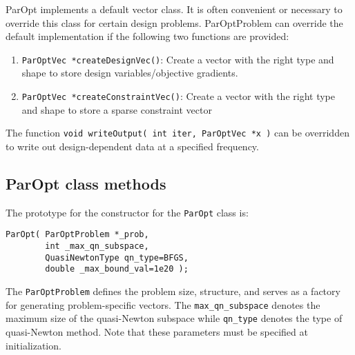 \documentclass[12pt]{article}
\begin{document}
ParOpt implements a default vector class. 
It is often convenient or necessary to override this class for certain design problems.
ParOptProblem can override the default implementation if the following two functions are provided:
\begin{enumerate}
\item \texttt{ParOptVec *createDesignVec()}: Create a vector with the right type and shape to store design variables/objective gradients.
\item \texttt{ParOptVec *createConstraintVec()}: Create a vector with the right type and shape to store a sparse constraint vector
\end{enumerate}  

The function \texttt{void writeOutput( int iter, ParOptVec *x )} can be overridden to write out design-dependent data at a specified frequency.
  
\subsection{ParOpt class methods}

The prototype for the constructor for the \texttt{ParOpt} class is:
%
\begin{verbatim}
ParOpt( ParOptProblem *_prob,
        int _max_qn_subspace,
        QuasiNewtonType qn_type=BFGS,
        double _max_bound_val=1e20 );
\end{verbatim}
%
The \texttt{ParOptProblem} defines the problem size, structure, and serves as a factory for generating problem-specific vectors.
The \texttt{max\_qn\_subspace} denotes the maximum size of the quasi-Newton subspace while \texttt{qn\_type} denotes the type of quasi-Newton method. Note that these parameters must be specified at initialization.
\end{document}
